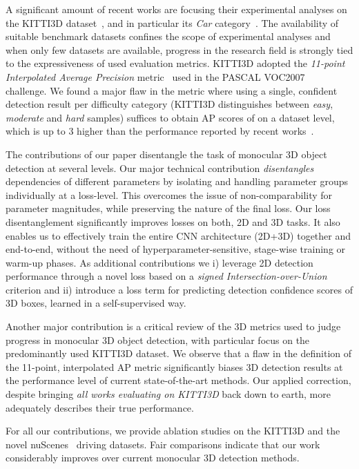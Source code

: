 \documentclass[10pt,twocolumn,letterpaper]{article}
\begin{document}
A significant amount of recent works are focusing their experimental analyses on the KITTI3D dataset~\cite{Geiger2012CVPR}, and in particular its \textit{Car} category~\cite{Manhardt_2019_CVPR,qin2019monogrnet,Roddick18,Xu_2018_CVPR}. The availability of suitable benchmark datasets confines the scope of experimental analyses and when only few datasets are available, progress in the research field is strongly tied to the expressiveness of used evaluation metrics. KITTI3D adopted the \textit{11-point Interpolated Average Precision} metric~\cite{Salton1986} used in the PASCAL VOC2007~\cite{Everingham2010} challenge. We found a major flaw in the metric where using a single, confident detection result per difficulty category (KITTI3D distinguishes between \textit{easy}, \textit{moderate} and \textit{hard} samples) suffices to obtain AP scores of  on a dataset level, which is up to 3 higher than the performance reported by recent works~\cite{NIPS2015_Chen,Chen_2016_CVPR,TongHe_2019_arxiv,Xu_2018_CVPR}. 

The contributions of our paper disentangle the task of monocular 3D object detection at several levels. Our major technical contribution \textit{disentangles} dependencies of different parameters by isolating and handling parameter groups individually at a loss-level. This overcomes the issue of non-comparability for parameter magnitudes, while preserving the nature of the final loss. Our loss disentanglement significantly improves losses on both, 2D and 3D tasks. It also enables us to effectively train the entire CNN architecture (2D+3D) together and end-to-end, without the need of hyperparameter-sensitive, stage-wise training or warm-up phases. As additional contributions we i) leverage 2D detection performance through a novel loss based on a \textit{signed Intersection-over-Union} criterion and ii) introduce a loss term for predicting detection confidence scores of 3D boxes, learned in a self-supervised way.

Another major contribution is a critical review of the 3D metrics used to judge progress in monocular 3D object detection, with particular focus on the predominantly used KITTI3D dataset. We observe that a flaw in the definition of the 11-point, interpolated AP metric significantly biases 3D detection results at the performance level of current state-of-the-art methods. Our applied correction, despite bringing \textit{all works evaluating on KITTI3D} back down to earth, more adequately describes their true performance. 

For all our contributions, we provide ablation studies on the KITTI3D and the novel nuScenes~\cite{Cae+19} driving datasets. Fair comparisons indicate that our work considerably improves over current monocular 3D detection methods.
\end{document}
